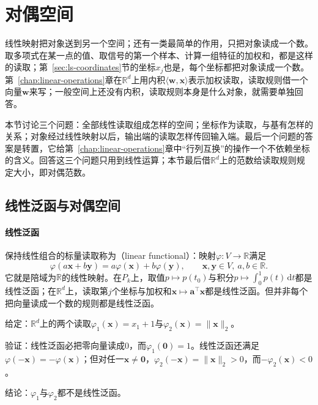 
\section{对偶空间}
\label{sec:ls-dual-spaces}

线性映射把对象送到另一个空间；还有一类最简单的作用，只把对象读成一个数。取多项式在某一点的值、取信号的第一个样本、计算一组特征的加权和，都是这样的读取；第~\ref{sec:ls-coordinates}节的坐标$x_j$也是，每个坐标都把对象读成一个数。第~\ref{chap:linear-operations}章在$\mathbb R^d$上用内积$\langle\bm w,\bm x\rangle$表示加权读取，读取规则借一个向量$\bm w$来写；一般空间上还没有内积，读取规则本身是什么对象，就需要单独回答。

本节讨论三个问题：全部线性读取组成怎样的空间；坐标作为读取，与基有怎样的关系；对象经过线性映射以后，输出端的读取怎样传回输入端。最后一个问题的答案是转置，它给第~\ref{chap:linear-operations}章中“行列互换”的操作一个不依赖坐标的含义。回答这三个问题只用到线性运算；本节最后借$\mathbb R^d$上的范数给读取规则规定大小，即对偶范数。

\subsection{线性泛函与对偶空间}
\label{sec:ls-dual-space}

\paragraph{线性泛函}
保持线性组合的标量读取称为（linear functional）：映射$\varphi:V\to\mathbb R$满足
\[
 \varphi(a\bm x+b\bm y)=a\varphi(\bm x)+b\varphi(\bm y),\qquad \bm x,\bm y\in V,\ a,b\in\mathbb R.
\]
它就是陪域为$\mathbb R$的线性映射。在$P_k$上，取值$p\mapsto p(t_0)$与积分$p\mapsto\int_0^1p(t)\,\mathrm dt$都是线性泛函；在$\mathbb R^d$上，读取第$j$个坐标与加权和$\bm x\mapsto\bm a^\top\bm x$都是线性泛函。但并非每个把向量读成一个数的规则都是线性泛函。
\begin{example}[反例：两个非线性的读取]
\label{ex:ls-nonlinear-readouts}
给定：$\mathbb R^d$上的两个读取$\varphi_1(\bm x)=x_1+1$与$\varphi_2(\bm x)=\lVert\bm x\rVert_2$。

验证：线性泛函必把零向量读成$0$，而$\varphi_1(\bm0)=1$。线性泛函还满足$\varphi(-\bm x)=-\varphi(\bm x)$；但对任一$\bm x\neq\bm0$，$\varphi_2(-\bm x)=\lVert\bm x\rVert_2>0$，而$-\varphi_2(\bm x)<0$。

结论：$\varphi_1$与$\varphi_2$都不是线性泛函。
\end{example}

